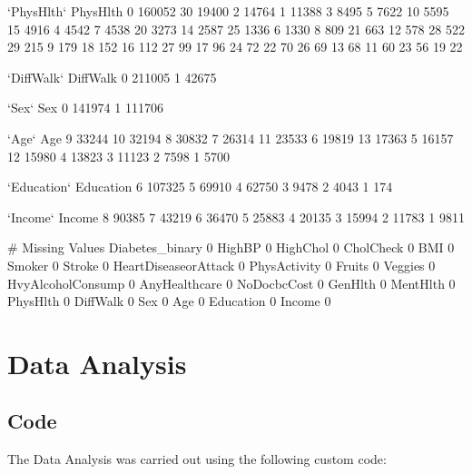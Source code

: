 \documentclass[11pt]{article}
\begin{document}
\begin{codeoutput}
`PhysHlth`
PhysHlth
0     160052
30     19400
2      14764
1      11388
3       8495
5       7622
10      5595
15      4916
4       4542
7       4538
20      3273
14      2587
25      1336
6       1330
8        809
21       663
12       578
28       522
29       215
9        179
18       152
16       112
27        99
17        96
24        72
22        70
26        69
13        68
11        60
23        56
19        22

`DiffWalk`
DiffWalk
0    211005
1     42675

`Sex`
Sex
0    141974
1    111706

`Age`
Age
9     33244
10    32194
8     30832
7     26314
11    23533
6     19819
13    17363
5     16157
12    15980
4     13823
3     11123
2      7598
1      5700

`Education`
Education
6    107325
5     69910
4     62750
3      9478
2      4043
1       174

`Income`
Income
8    90385
7    43219
6    36470
5    25883
4    20135
3    15994
2    11783
1     9811

# Missing Values
Diabetes_binary         0
HighBP                  0
HighChol                0
CholCheck               0
BMI                     0
Smoker                  0
Stroke                  0
HeartDiseaseorAttack    0
PhysActivity            0
Fruits                  0
Veggies                 0
HvyAlcoholConsump       0
AnyHealthcare           0
NoDocbcCost             0
GenHlth                 0
MentHlth                0
PhysHlth                0
DiffWalk                0
Sex                     0
Age                     0
Education               0
Income                  0
\end{codeoutput}

\section{Data Analysis}
\subsection{{Code}}
The Data Analysis was carried out using the following custom code:
\end{document}
